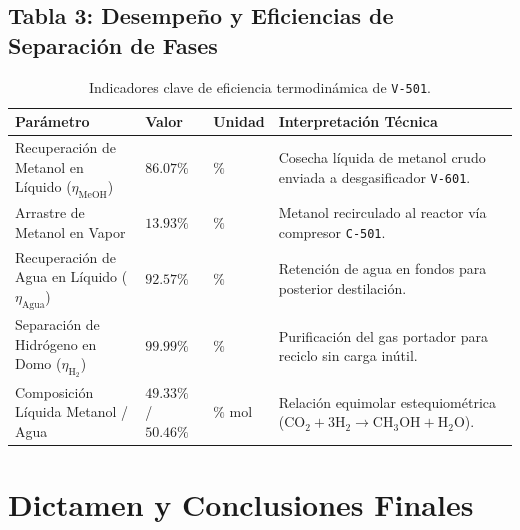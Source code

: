 \documentclass[11pt,letterpaper]{article}
\begin{document}
\subsection{Tabla 3: Desempeño y Eficiencias de Separación de Fases}
\begin{table}[H]
\centering
\small
\begin{tabularx}{\textwidth}{>{\raggedright\arraybackslash}p{4.6cm} >{\centering\arraybackslash}p{3.2cm} >{\centering\arraybackslash}p{1.4cm} >{\raggedright\arraybackslash}X}
\toprule
\textbf{Parámetro} & \textbf{Valor} & \textbf{Unidad} & \textbf{Interpretación Técnica} \\
\midrule
Recuperación de Metanol en Líquido ($\eta_{\text{MeOH}}$) & $\mathbf{86.07\%}$ & $\%$ & Cosecha líquida de metanol crudo enviada a desgasificador \texttt{V-601}. \\
Arrastre de Metanol en Vapor & $13.93\%$ & $\%$ & Metanol recirculado al reactor vía compresor \texttt{C-501}. \\
Recuperación de Agua en Líquido ($\eta_{\text{Agua}}$) & $92.57\%$ & $\%$ & Retención de agua en fondos para posterior destilación. \\
Separación de Hidrógeno en Domo ($\eta_{\text{H}_2}$) & $\mathbf{99.99\%}$ & $\%$ & Purificación del gas portador para reciclo sin carga inútil. \\
Composición Líquida Metanol / Agua & $\mathbf{49.33\%}$ / $\mathbf{50.46\%}$ & $\%$ mol & Relación equimolar estequiométrica ($\text{CO}_2 + 3\text{H}_2 \to \text{CH}_3\text{OH} + \text{H}_2\text{O}$). \\
\bottomrule
\end{tabularx}
\caption{Indicadores clave de eficiencia termodinámica de \texttt{V-501}.}
\end{table}

\clearpage
\section{Dictamen y Conclusiones Finales}
\end{document}
